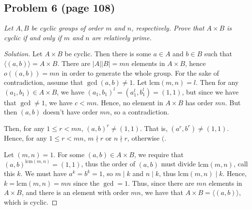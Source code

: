 \documentclass{article}
\begin{document}
\subsection*{Problem 6 (page 108)}
{\it Let $A,B$ be cyclic groups of order $m$ and $n$, respectively.
Prove that $A \times B$ is cyclic if and only if $m$ and $n$ are relatively prime.}
\begin{proof}[Solution]\let\qed\relax
	Let $A \times B$ be cyclic.
	Then there is some $a \in A$ and $b \in B$ such that $\langle (a,b) \rangle = A \times B$.
	There are $|A||B| = mn$ elements in $A \times B$,
	hence $o((a,b)) = mn$ in order to generate the whole group.
	For the sake of contradiction, assume that $\gcd(a,b) \neq 1$.
	Let $\mathrm{lcm}(m,n) = l$.
	Then for any $(a_1,b_1) \in A \times B$, we have
	$(a_1,b_1)^l = (a_1^l,b_1^l) = (1,1)$,
	but since we have that $\gcd \neq 1$, we have $c < mn$.
	Hence, no element in $A \times B$ has order $mn$.
	But then $(a,b)$ doesn't have order $mn$, so a contradiction.

	Then, for any $ 1 \leq r < mn$, $(a,b)^r \neq (1,1)$.
	That is, $(a^r,b^r) \neq (1,1)$.
	Hence, for any $1 \leq r < mn$, $m \nmid r$ or $n \nmid r$,
	otherwise $($.

	Let $(m,n) = 1$.
	For some $(a,b) \in A \times B$, we require that $(a,b)^{\mathrm{lcm}(m,n)} = (1,1)$,
	thus the order of $(a,b)$ must divide $\mathrm{lcm}(m,n)$, call this $k$.
	We must have $a^k = b^k = 1$, so $m \mid k$ and $n \mid k$,
	thus $\mathrm{lcm}(m,n) \mid k$.
	Hence, $k = \mathrm{lcm}(m,n) = mn$ since the $\gcd = 1$.
	Thus, since there are $mn$ elements in $A \times B$,
	and there is an element with order $mn$,
	we have that $A \times B = \langle (a,b) \rangle$, which is cyclic.
\end{proof}
\end{document}
